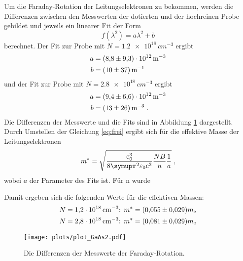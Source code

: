 Um die Faraday-Rotation der Leitungselektronen zu bekommen, werden die Differenzen zwischen den Messwerten der dotierten und der hochreinen
Probe gebildet und jeweils ein linearer Fit der Form
\begin{equation}
  f(\lambda^2) = a\lambda^2 + b
\end{equation}
berechnet.
Der Fit zur Probe mit $N = \SI{1.2e18}{cm^{-3}}$ ergibt
\begin{align*}
  a &= \SI{8.8\pm9.3e12}{m^{-3}} \\
  b &= \SI{10\pm37}{m^{-1}}
\end{align*}
und der Fit zur Probe mit $N = \SI{2.8e18}{cm^{-3}}$ ergibt
\begin{align*}
  a &= \SI{9.4\pm6.6e12}{m^{-3}} \\
  b &= \SI{13\pm26}{m^{-3}} \;.
\end{align*}
Die Differenzen der Messwerte und die Fits sind in Abbildung \ref{fig:GaAs2} dargestellt. Durch Umstellen der Gleichung \eqref{eq:frei}
ergibt sich für die effektive Masse der Leitungselektronen
\begin{equation}
  m^* = \sqrt{\frac{\text{e}_0^3}{8\pii^2\varepsilon_0\text{c}^3}\frac{NB}{n}\frac{1}{a}} \;,
\end{equation}
wobei $a$ der Parameter des Fits ist. Für n wurde

\cite{n_GaAs}
Damit ergeben sich die folgenden Werte für die effektiven Massen:
\begin{align*}
  N = \SI{1.2e18}{cm^{-3}} &\text{: } m^*= (\num{0.055\pm0.029})m_\text{e} \\
  N = \SI{2.8e18}{cm^{-3}} &\text{: } m^*= (\num{0.081\pm0.029})m_\text{e}
\end{align*}


\begin{figure}
  \centering
  \texttt{[image: plots/plot\_GaAs2.pdf]}
  \caption{Die Differenzen der Messwerte der Faraday-Rotation.}
  \label{fig:GaAs2}
\end{figure}
